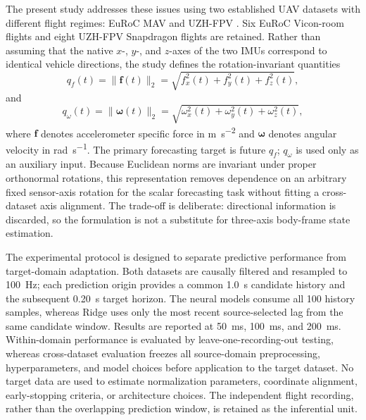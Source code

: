 \documentclass[preprint,12pt]{elsarticle}
\newcommand{\qf}{q_f}
\newcommand{\qw}{q_\omega}
\newcommand{\vect}[1]{\boldsymbol{#1}}
\begin{document}
The present study addresses these issues using two established UAV datasets with different flight regimes: EuRoC MAV \cite{Burri2016EuRoC} and UZH-FPV \cite{Delmerico2019UZHFPV}. Six EuRoC Vicon-room flights and eight UZH-FPV Snapdragon flights are retained. Rather than assuming that the native $x$-, $y$-, and $z$-axes of the two IMUs correspond to identical vehicle directions, the study defines the rotation-invariant quantities
\begin{equation}
\qf(t)=\|\vect{f}(t)\|_2=\sqrt{f_x^2(t)+f_y^2(t)+f_z^2(t)},
\label{eq:qf}
\end{equation}
and
\begin{equation}
\qw(t)=\|\vect{\omega}(t)\|_2=\sqrt{\omega_x^2(t)+\omega_y^2(t)+\omega_z^2(t)},
\label{eq:qw}
\end{equation}
where $\vect{f}$ denotes accelerometer specific force in \si{\metre\per\second\squared} and $\vect{\omega}$ denotes angular velocity in \si{\radian\per\second}. The primary forecasting target is future $\qf$; $\qw$ is used only as an auxiliary input. Because Euclidean norms are invariant under proper orthonormal rotations, this representation removes dependence on an arbitrary fixed sensor-axis rotation for the scalar forecasting task without fitting a cross-dataset axis alignment. The trade-off is deliberate: directional information is discarded, so the formulation is not a substitute for three-axis body-frame state estimation.

The experimental protocol is designed to separate predictive performance from target-domain adaptation. Both datasets are causally filtered and resampled to \SI{100}{\hertz}; each prediction origin provides a common \SI{1.0}{\second} candidate history and the subsequent \SI{0.20}{\second} target horizon. The neural models consume all 100 history samples, whereas Ridge uses only the most recent source-selected lag from the same candidate window. Results are reported at \SI{50}{\milli\second}, \SI{100}{\milli\second}, and \SI{200}{\milli\second}. Within-domain performance is evaluated by leave-one-recording-out testing, whereas cross-dataset evaluation freezes all source-domain preprocessing, hyperparameters, and model choices before application to the target dataset. No target data are used to estimate normalization parameters, coordinate alignment, early-stopping criteria, or architecture choices. The independent flight recording, rather than the overlapping prediction window, is retained as the inferential unit.
\end{document}
